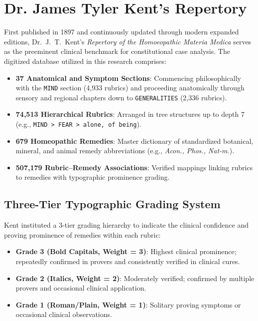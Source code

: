\begin{sloppypar}
\section{Dr. James Tyler Kent's Repertory}
First published in 1897 and continuously updated through modern expanded editions, Dr.~J.~T.~Kent's \emph{Repertory of the Homoeopathic Materia Medica} serves as the preeminent clinical benchmark for constitutional case analysis. The digitized database utilized in this research comprises:
\begin{itemize}
    \item \textbf{37 Anatomical and Symptom Sections}: Commencing philosophically with the \texttt{MIND} section (4,933 rubrics) and proceeding anatomically through sensory and regional chapters down to \texttt{GENERALITIES} (2,336 rubrics).
    \item \textbf{74,513 Hierarchical Rubrics}: Arranged in tree structures up to depth 7 (e.g., \texttt{MIND > FEAR > alone, of being}).
    \item \textbf{679 Homeopathic Remedies}: Master dictionary of standardized botanical, mineral, and animal remedy abbreviations (e.g., \emph{Acon., Phos., Nat-m.}).
    \item \textbf{507,179 Rubric--Remedy Associations}: Verified mappings linking rubrics to remedies with typographic prominence grading.
\end{itemize}

\subsection{Three-Tier Typographic Grading System}
Kent instituted a 3-tier grading hierarchy to indicate the clinical confidence and proving prominence of remedies within each rubric:
\begin{itemize}
    \item \textbf{Grade 3 (Bold Capitals, Weight = 3)}: Highest clinical prominence; repeatedly confirmed in provers and consistently verified in clinical cures.
    \item \textbf{Grade 2 (Italics, Weight = 2)}: Moderately verified; confirmed by multiple provers and occasional clinical application.
    \item \textbf{Grade 1 (Roman/Plain, Weight = 1)}: Solitary proving symptoms or occasional clinical observations.
\end{itemize}


\end{sloppypar}
